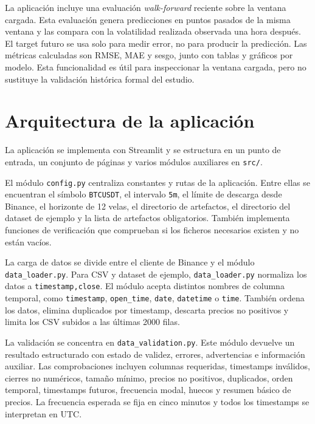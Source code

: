 La aplicación incluye una evaluación \textit{walk-forward} reciente sobre la ventana cargada. Esta evaluación genera predicciones en puntos pasados de la misma ventana y las compara con la volatilidad realizada observada una hora después. El target futuro se usa solo para medir error, no para producir la predicción. Las métricas calculadas son RMSE, MAE y sesgo, junto con tablas y gráficos por modelo. Esta funcionalidad es útil para inspeccionar la ventana cargada, pero no sustituye la validación histórica formal del estudio.

\section{Arquitectura de la aplicación}\label{sec:arquitectura-mvp}

La aplicación se implementa con Streamlit y se estructura en un punto de entrada, un conjunto de páginas y varios módulos auxiliares en \texttt{src/}.

El módulo \texttt{config.py} centraliza constantes y rutas de la aplicación. Entre ellas se encuentran el símbolo \texttt{BTCUSDT}, el intervalo \texttt{5m}, el límite de descarga desde Binance, el horizonte de 12 velas, el directorio de artefactos, el directorio del dataset de ejemplo y la lista de artefactos obligatorios. También implementa funciones de verificación que comprueban si los ficheros necesarios existen y no están vacíos.

La carga de datos se divide entre el cliente de Binance y el módulo \texttt{data\_\allowbreak loader.py}. Para CSV y dataset de ejemplo, \texttt{data\_\allowbreak loader.py} normaliza los datos a \texttt{timestamp,close}. El módulo acepta distintos nombres de columna temporal, como \texttt{timestamp}, \texttt{open\_\allowbreak time}, \texttt{date}, \texttt{datetime} o \texttt{time}. También ordena los datos, elimina duplicados por timestamp, descarta precios no positivos y limita los CSV subidos a las últimas 2000 filas.

La validación se concentra en \texttt{data\_\allowbreak validation.py}. Este módulo devuelve un resultado estructurado con estado de validez, errores, advertencias e información auxiliar. Las comprobaciones incluyen columnas requeridas, timestamps inválidos, cierres no numéricos, tamaño mínimo, precios no positivos, duplicados, orden temporal, timestamps futuros, frecuencia modal, huecos y resumen básico de precios. La frecuencia esperada se fija en cinco minutos y todos los timestamps se interpretan en UTC.

